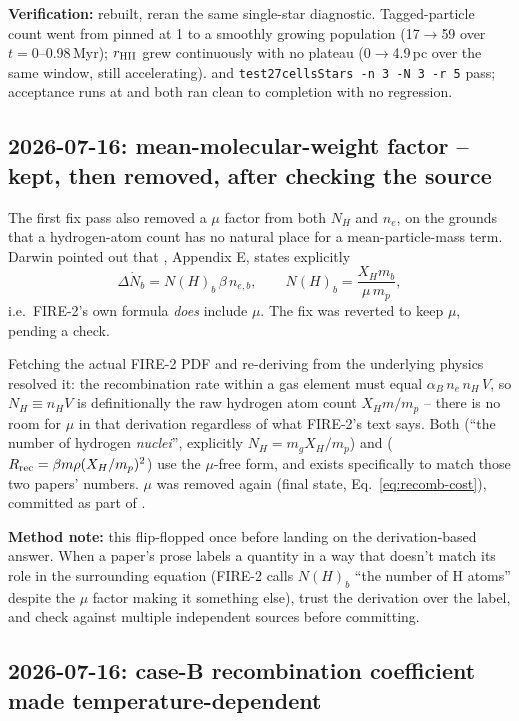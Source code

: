 \textbf{Verification:} rebuilt, reran the same single-star diagnostic.
Tagged-particle count went from pinned at 1 to a smoothly growing
population (17$\to$59 over $t=0$--0.98\,Myr); $r_{\rm HII}$ grew
continuously with no plateau (0$\to$4.9\,pc over the same window,
still accelerating).  and
\texttt{test27cellsStars -n 3 -N 3 -r 5} pass;
 acceptance runs at  and
 both ran clean to completion with no
regression.

\subsection{2026-07-16: mean-molecular-weight factor -- kept, then removed, after checking the source}
\label{sec:mu-bug}

The first fix pass also removed a $\mu$ factor from both $N_H$ and
$n_e$, on the grounds that a hydrogen-atom count has no natural place
for a mean-particle-mass term. Darwin pointed out that
\citet{Hopkins2018}, Appendix E, states explicitly
\[
  \Delta\dot N_b = N(H)_b\,\beta\,n_{e,b}, \qquad
  N(H)_b = \frac{X_H m_b}{\mu\, m_p},
\]
i.e.\ FIRE-2's own formula \emph{does} include $\mu$. The fix was
reverted to keep $\mu$, pending a check.

Fetching the actual FIRE-2 PDF and re-deriving from the underlying
physics resolved it: the recombination rate within a gas element must
equal $\alpha_B\, n_e\, n_H\, V$, so $N_H \equiv n_H V$ is definitionally
the raw hydrogen atom count $X_H m/m_p$ -- there is no room for $\mu$
in that derivation regardless of what FIRE-2's text says. Both
\citet{Hu2017} (``the number of hydrogen \emph{nuclei}'', explicitly
$N_H = m_g X_H/m_p$) and \citet{Smith2021}
($R_{\rm rec}=\beta m\rho(X_H/m_p)^2$) use the $\mu$-free form, and
 exists specifically to match
those two papers' numbers. $\mu$ was removed again (final state,
Eq.~\ref{eq:recomb-cost}), committed as part of .

\textbf{Method note:} this flip-flopped once before landing on the
derivation-based answer. When a paper's prose labels a quantity in a
way that doesn't match its role in the surrounding equation (FIRE-2
calls $N(H)_b$ ``the number of H atoms'' despite the $\mu$ factor
making it something else), trust the derivation over the label, and
check against multiple independent sources before committing.

\subsection{2026-07-16: case-B recombination coefficient made temperature-dependent}
\label{sec:caseB-fix}


